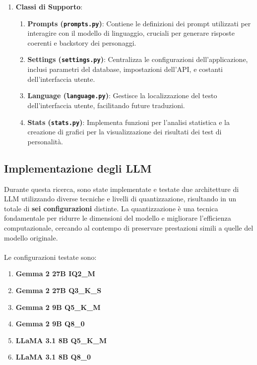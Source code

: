 \begin{enumerate}
    \item \textbf{Classi di Supporto}:
    \begin{enumerate}
        \item \textbf{Prompts (\texttt{prompts.py})}:
        Contiene le definizioni dei prompt utilizzati per interagire con il modello di linguaggio, cruciali per generare risposte coerenti e backstory dei personaggi.
        
        \item \textbf{Settings (\texttt{settings.py})}:
        Centralizza le configurazioni dell'applicazione, inclusi parametri del database, impostazioni dell'API, e costanti dell'interfaccia utente.
        
        \item \textbf{Language (\texttt{language.py})}:
        Gestisce la localizzazione del testo dell'interfaccia utente, facilitando future traduzioni.
        
        \item \textbf{Stats (\texttt{stats.py})}:
        Implementa funzioni per l'analisi statistica e la creazione di grafici per la visualizzazione dei risultati dei test di personalità.
    \end{enumerate}

\end{enumerate}

\subsection{Implementazione degli LLM}

Durante questa ricerca, sono state implementate e testate due architetture di LLM utilizzando diverse tecniche e livelli di quantizzazione, risultando in un totale di \textbf{sei configurazioni} distinte.
La quantizzazione è una tecnica fondamentale per ridurre le dimensioni del modello e migliorare l'efficienza computazionale, cercando al contempo di preservare prestazioni simili a quelle del modello originale.\\\\
Le configurazioni testate sono:

\begin{enumerate}
    \item \textbf{Gemma 2 27B IQ2\_M}
    \item \textbf{Gemma 2 27B Q3\_K\_S}
    \item \textbf{Gemma 2 9B Q5\_K\_M}
    \item \textbf{Gemma 2 9B Q8\_0}
    \item \textbf{LLaMA 3.1 8B Q5\_K\_M}
    \item \textbf{LLaMA 3.1 8B Q8\_0}
\end{enumerate}

